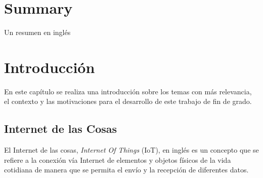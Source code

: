 \documentclass[a4paper, 12pt, oneside]{book}
\begin{document}

\chapter*{Summary}

Un resumen en inglés



\tableofcontents 
\cleardoublepage
\listoffigures %



\cleardoublepage
\chapter{Introducción}
\label{chap:intro} %

En este capítulo se realiza una introducción sobre los temas con más relevancia, el contexto y las motivaciones para el desarrollo de este trabajo de fin de grado.

\section{Internet de las Cosas}
\label{sec:Internet de las Cosas}
El Internet de las cosas, \textit{Internet Of Things} (IoT), en inglés es un concepto que se refiere a la conexión vía Internet de elementos y objetos físicos de la vida cotidiana de manera que se permita el envío y la recepción de diferentes datos.
\end{document}
